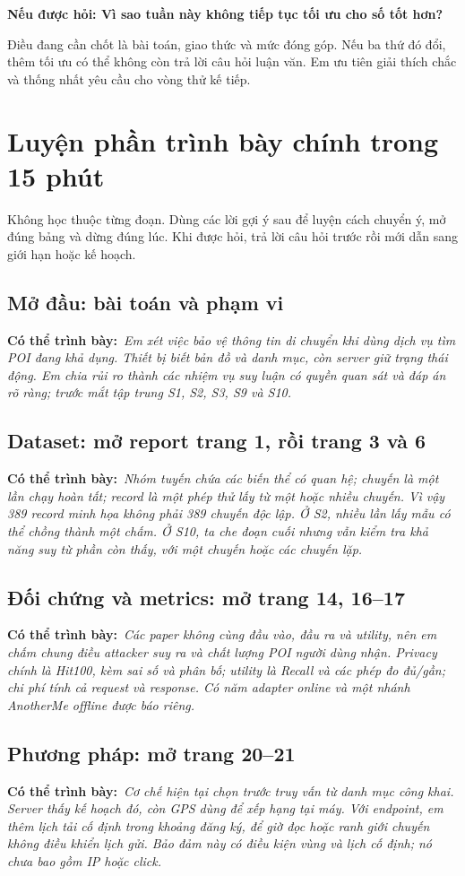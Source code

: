 \documentclass[10pt,a4paper]{article}
\newcommand{\say}[1]{\par\textbf{Có thể trình bày:}\ \textit{#1}\par}
\newcommand{\ask}[2]{\par\textbf{Nếu được hỏi: #1}\par #2\par}
\newcommand{\guidepage}[1]{\clearpage\section{#1}}
\begin{document}
\ask{Vì sao tuần này không tiếp tục tối ưu cho số tốt hơn?}{Điều đang cần chốt là bài toán, giao thức và mức đóng góp. Nếu ba thứ đó đổi, thêm tối ưu có thể không còn trả lời câu hỏi luận văn. Em ưu tiên giải thích chắc và thống nhất yêu cầu cho vòng thử kế tiếp.}

\guidepage{Luyện phần trình bày chính trong 15 phút}
Không học thuộc từng đoạn. Dùng các lời gợi ý sau để luyện cách chuyển ý, mở đúng bảng và dừng đúng lúc. Khi được hỏi, trả lời câu hỏi trước rồi mới dẫn sang giới hạn hoặc kế hoạch.

\subsection*{Mở đầu: bài toán và phạm vi}
\say{Em xét việc bảo vệ thông tin di chuyển khi dùng dịch vụ tìm POI đang khả dụng. Thiết bị biết bản đồ và danh mục, còn server giữ trạng thái động. Em chia rủi ro thành các nhiệm vụ suy luận có quyền quan sát và đáp án rõ ràng; trước mắt tập trung S1, S2, S3, S9 và S10.}

\subsection*{Dataset: mở report trang 1, rồi trang 3 và 6}
\say{Nhóm tuyến chứa các biến thể có quan hệ; chuyến là một lần chạy hoàn tất; record là một phép thử lấy từ một hoặc nhiều chuyến. Vì vậy 389 record minh họa không phải 389 chuyến độc lập. Ở S2, nhiều lần lấy mẫu có thể chồng thành một chấm. Ở S10, ta che đoạn cuối nhưng vẫn kiểm tra khả năng suy từ phần còn thấy, với một chuyến hoặc các chuyến lặp.}

\subsection*{Đối chứng và metrics: mở trang 14, 16--17}
\say{Các paper không cùng đầu vào, đầu ra và utility, nên em chấm chung điều attacker suy ra và chất lượng POI người dùng nhận. Privacy chính là Hit100, kèm sai số và phân bố; utility là Recall và các phép đo đủ/gần; chi phí tính cả request và response. Có năm adapter online và một nhánh AnotherMe offline được báo riêng.}

\subsection*{Phương pháp: mở trang 20--21}
\say{Cơ chế hiện tại chọn trước truy vấn từ danh mục công khai. Server thấy kế hoạch đó, còn GPS dùng để xếp hạng tại máy. Với endpoint, em thêm lịch tải cố định trong khoảng đăng ký, để giờ đọc hoặc ranh giới chuyến không điều khiển lịch gửi. Bảo đảm này có điều kiện vùng và lịch cố định; nó chưa bao gồm IP hoặc click.}
\end{document}
